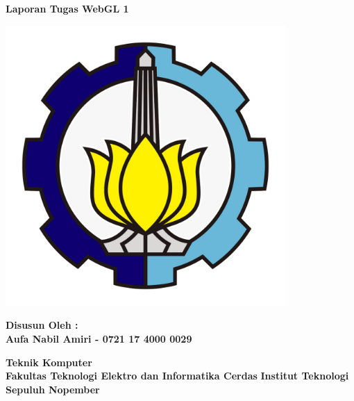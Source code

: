 
\begin{titlepage}
    \begin{center}

        \huge
        \textbf{Laporan Tugas WebGL 1}

        \vfill

        \includegraphics[width=0.8\textwidth]{logo.png}

        \vfill

        \large
        \textbf{Disusun Oleh :}\\
        \textbf{Aufa Nabil Amiri - 0721 17 4000 0029}

        \vspace*{2cm}

        \normalsize
        \textbf{Teknik Komputer}\\
        \textbf{Fakultas Teknologi Elektro dan Informatika Cerdas}
        \textbf{Institut Teknologi Sepuluh Nopember}

    \end{center}
\end{titlepage}